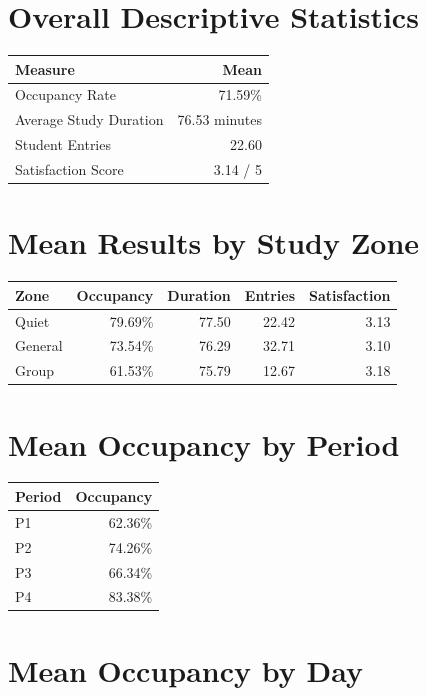 
\section*{Overall Descriptive Statistics}

\begin{tabular}{lr}
	\textbf{Measure} & \textbf{Mean} \\
	\hline
	Occupancy Rate & 71.59\% \\
	Average Study Duration & 76.53 minutes \\
	Student Entries & 22.60 \\
	Satisfaction Score & 3.14 / 5 \\
\end{tabular}

\section*{Mean Results by Study Zone}

\begin{tabular}{lrrrr}
	\textbf{Zone} & \textbf{Occupancy} & \textbf{Duration} & \textbf{Entries} & \textbf{Satisfaction} \\
	\hline
	Quiet & 79.69\% & 77.50 & 22.42 & 3.13 \\
	General & 73.54\% & 76.29 & 32.71 & 3.10 \\
	Group & 61.53\% & 75.79 & 12.67 & 3.18 \\
\end{tabular}

\section*{Mean Occupancy by Period}

\begin{tabular}{lr}
	\textbf{Period} & \textbf{Occupancy} \\
	\hline
	P1 & 62.36\% \\
	P2 & 74.26\% \\
	P3 & 66.34\% \\
	P4 & 83.38\% \\
\end{tabular}

\section*{Mean Occupancy by Day}

